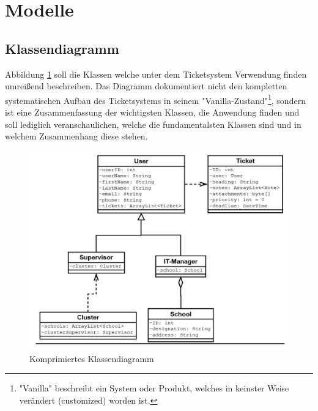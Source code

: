 		
	\newpage
	\section{Modelle}
	\subsection{Klassendiagramm}
	Abbildung \ref{Klassendiagramm_System} soll die Klassen welche unter dem Ticketsystem Verwendung finden umreißend beschreiben. Das Diagramm dokumentiert nicht den kompletten systematischen Aufbau des Ticketsystems in seinem "Vanilla-Zustand"\footnote{"Vanilla" beschreibt ein System oder Produkt, welches in keinster Weise verändert (customized) worden ist.}, sondern ist eine Zusammenfassung der wichtigsten Klassen, die Anwendung finden und soll lediglich veranschaulichen, welche die fundamentalsten Klassen sind und in welchem Zusammenhang diese stehen.
	
	\begin{figure}[h]
		\centering
		\includegraphics[scale=0.9]{figures/Klassendiagramm.jpg}
		\caption{Komprimiertes Klassendiagramm}
		\label{Klassendiagramm_System}
	\end{figure}
	

	\newpage
